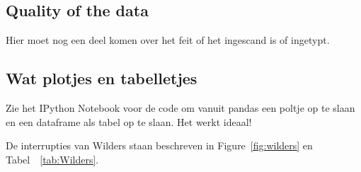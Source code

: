 \subsection{Quality of the data}
Hier moet nog een deel komen over het feit of het ingescand is of ingetypt.

\pagebreak
\subsection{Wat plotjes en tabelletjes}

Zie het IPython Notebook voor de code om vanuit pandas een poltje op te slaan en een dataframe als tabel op te slaan. Het werkt ideaal! 

De interrupties van Wilders staan beschreven in Figure~\ref{fig:wilders} en Tabel~~\ref{tab:Wilders}.





\pagebreak

%


\pagebreak
